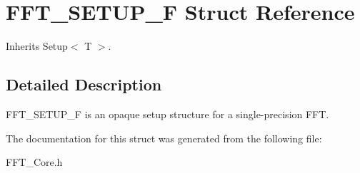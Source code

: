 \hypertarget{struct_float_setup}{}\section{F\+F\+T\+\_\+\+S\+E\+T\+U\+P\+\_\+F Struct Reference}
\label{struct_float_setup}


Inherits Setup$<$ T $>$.



\subsection{Detailed Description}
F\+F\+T\+\_\+\+S\+E\+T\+U\+P\+\_\+F is an opaque setup structure for a single-\/precision F\+FT. 

The documentation for this struct was generated from the following file\+:\begin{DoxyCompactItemize}
\item 
F\+F\+T\+\_\+\+Core.\+h\end{DoxyCompactItemize}
